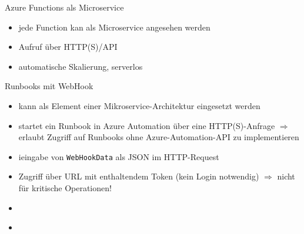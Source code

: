 \begin{flashcard}[]{Azure Functions als Microservice}
  \begin{itemize}
    \item jede Function kan als Microservice angesehen werden
    \item Aufruf über HTTP(S)/API
    \item automatische Skalierung, serverlos
  \end{itemize}
\end{flashcard}

\begin{flashcard}[]{Runbooks mit WebHook}
  \begin{itemize}
    \item kann als Element einer Mikroservice-Architektur eingesetzt werden
    \item startet ein Runbook in Azure Automation über eine HTTP(S)-Anfrage
      $\Rightarrow$ erlaubt Zugriff auf Runbooks ohne Azure-Automation-API zu implementieren
    \item ieingabe von \texttt{WebHookData} als JSON im HTTP-Request
    \item Zugriff über URL mit enthaltendem Token (kein Login notwendig)\newline
      $\Rightarrow$ nicht für kritische Operationen!
  \end{itemize}
\end{flashcard}


\begin{flashcard}[]{}
  \begin{itemize}
    \item
  \end{itemize}
\end{flashcard}

\begin{flashcard}[]{}
  \begin{itemize}
    \item
  \end{itemize}
\end{flashcard}

